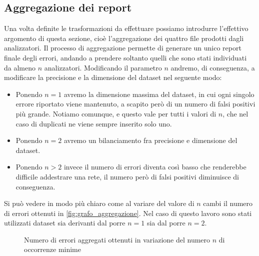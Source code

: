 
\subsection{Aggregazione dei report}
Una volta definite le trasformazioni da effettuare possiamo introdurre l'effettivo argomento di questa sezione, cioè l'aggregazione dei quattro file prodotti dagli analizzatori.
Il processo di aggregazione permette di generare un unico report finale degli errori, andando a prendere soltanto quelli che sono stati individuati da almeno $n$ analizzatori. 
Modificando il parametro $n$ andremo, di conseguenza, a modificare la precisione e la dimensione del dataset nel seguente modo:
  \begin{itemize}
    \item Ponendo $n=1$ avremo la dimensione massima del dataset, in cui ogni singolo errore riportato viene mantenuto, a scapito però di un numero di falsi positivi più grande.
          Notiamo comunque, e questo vale per tutti i valori di $n$, che nel caso di duplicati ne viene sempre inserito solo uno.
    \item Ponendo $n=2$ avremo un bilanciamento fra precisione e dimensione del dataset. 
    \item Ponendo $n>2$ invece il numero di errori diventa così basso che renderebbe difficile addestrare una rete, il numero però di falsi positivi diminuisce di conseguenza.
  \end{itemize}
Si può vedere in modo più chiaro come al variare del valore di $n$ cambi il numero di errori ottenuti in \autoref{fig:grafo_aggregazione}.
Nel caso di questo lavoro sono stati utilizzati dataset sia derivanti dal porre $n=1$ sia dal porre $n=2$.

\begin{figure}[h]
    \centering
    \caption{Numero di errori aggregati ottenuti in variazione del numero $n$ di occorrenze minime}
    \label{fig:grafo_aggregazione}
\end{figure}

